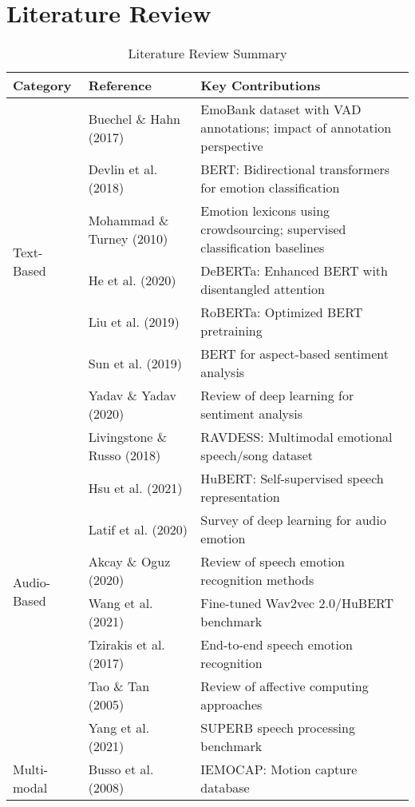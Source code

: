\documentclass[conference]{IEEEtran}
\begin{document}
\section{Literature Review}
\begin{table}[htbp]
\small
\caption{Literature Review Summary\label{tab:lit_review}}
\begin{tabular}{|p{1.2cm}|p{1.8cm}|p{4.5cm}|}
\hline
\textbf{Category} & \textbf{Reference} & \textbf{Key Contributions} \\
\hline
\multirow{7}{*}{Text-Based} & 
Buechel \& Hahn (2017) & EmoBank dataset with VAD annotations; impact of annotation perspective \\
\cline{2-3}
& Devlin et al. (2018) & BERT: Bidirectional transformers for emotion classification \\
\cline{2-3}
& Mohammad \& Turney (2010) & Emotion lexicons using crowdsourcing; supervised classification baselines \\
\cline{2-3}
& He et al. (2020) & DeBERTa: Enhanced BERT with disentangled attention \\
\cline{2-3}
& Liu et al. (2019) & RoBERTa: Optimized BERT pretraining \\
\cline{2-3}
& Sun et al. (2019) & BERT for aspect-based sentiment analysis \\
\cline{2-3}
& Yadav \& Yadav (2020) & Review of deep learning for sentiment analysis \\
\hline
\multirow{8}{*}{Audio-Based} & 
Livingstone \& Russo (2018) & RAVDESS: Multimodal emotional speech/song dataset \\
\cline{2-3}
& Hsu et al. (2021) & HuBERT: Self-supervised speech representation \\
\cline{2-3}
& Latif et al. (2020) & Survey of deep learning for audio emotion \\
\cline{2-3}
& Akcay \& Oguz (2020) & Review of speech emotion recognition methods \\
\cline{2-3}
& Wang et al. (2021) & Fine-tuned Wav2vec 2.0/HuBERT benchmark \\
\cline{2-3}
& Tzirakis et al. (2017) & End-to-end speech emotion recognition \\
\cline{2-3}
& Tao \& Tan (2005) & Review of affective computing approaches \\
\cline{2-3}
& Yang et al. (2021) & SUPERB speech processing benchmark \\
\hline
\multirow{5}{*}{Multi-modal} & 
Busso et al. (2008) & IEMOCAP: Motion capture database \\

\end{tabular}
\end{table}
\end{document}
